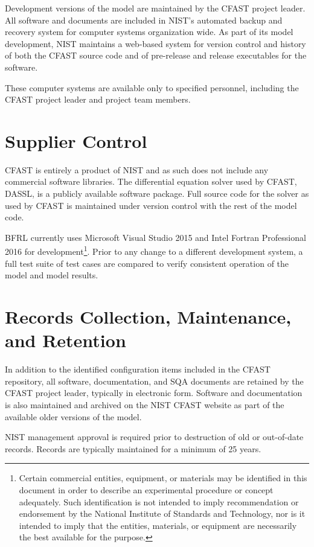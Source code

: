 \documentclass[12pt]{book}
\begin{document}
Development versions of the model are maintained by the CFAST project leader.  All software and documents are included in NIST's automated backup and recovery system for computer systems organization wide. As part of its model development, NIST maintains a web-based system for version control and history of both the CFAST source code and of pre-release and release executables for the software.

These computer systems are available only to specified personnel, including the CFAST project leader and project team members.

\section{Supplier Control}

CFAST is entirely a product of NIST and as such does not include any commercial software libraries. The differential equation solver used by CFAST, DASSL, is a publicly available software package.  Full source code for the solver as used by CFAST is maintained under version control with the rest of the model code.

BFRL currently uses Microsoft Visual Studio 2015 and Intel Fortran Professional 2016 for development\footnote{Certain commercial entities, equipment, or materials may be identified in this document in order to describe an experimental procedure or concept adequately. Such identification is not intended to imply recommendation or endorsement by the National Institute of Standards and Technology, nor is it intended to imply that the entities, materials, or equipment are necessarily the best available for the purpose.}.  Prior to any change to a different development system, a full test suite of test cases are compared to verify consistent operation of the model and model results.

\section{Records Collection, Maintenance, and Retention}

In addition to the identified configuration items included in the CFAST repository, all software, documentation, and SQA documents are retained by the CFAST project leader, typically in electronic form. Software and documentation is also maintained and archived on the NIST CFAST website as part of the available older versions of the model.

NIST management approval is required prior to destruction of old or out-of-date records. Records are typically maintained for a minimum of 25 years.
\end{document}
